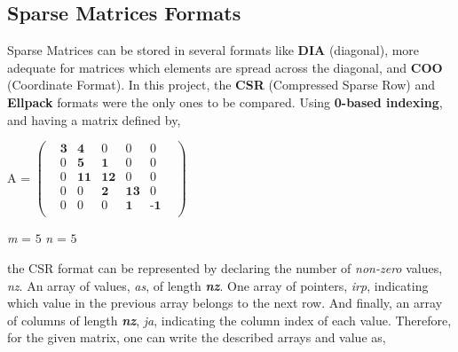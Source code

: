 \documentclass[12pt]{article}
\begin{document}
\subsection*{Sparse Matrices Formats}

\par Sparse Matrices can be stored in several formats like \textbf{DIA} (diagonal), more adequate for matrices which elements are spread across the diagonal,  and \textbf{COO} (Coordinate Format).\cite{sparse-gpu} In this project, the \textbf{CSR} (Compressed Sparse Row) and \textbf{Ellpack} formats were the only ones to be compared. Using \textbf{0-based indexing}, and having a matrix defined by,

\begin{center}
\centering
\begin{minipage}{.4\textwidth}
  \flushright
  A  =   
	$
	\begin{pmatrix}
    & \textbf{3} & \textbf{4} & 0 & 0 & 0 & \\
    & 0 & \textbf{5} & \textbf{1} & 0 & 0 & \\
    & 0 & \textbf{11} & \textbf{12} & 0 & 0 & \\
    & 0 & 0 & \textbf{2} & \textbf{13} & 0 & \\
    & 0 & 0 & 0 & \textbf{1} & \textbf{-1} & \\
	\end{pmatrix}
	$
\end{minipage}%
\begin{minipage}{.4\textwidth}
 \center
  \textit{m} = $5$
  \linebreak
  \textit{n} = $5$
\end{minipage}
\linebreak
\end{center}

\par the CSR format can be represented by declaring the number of \textit{non-zero} values, \textit{nz}. An array of values, \textit{as}, of length \textbf{\textit{nz}}. One array of pointers, \textit{irp}, indicating which value in the previous array belongs to the next row. And finally, an array of columns of length \textbf{\textit{nz}}, \textit{ja}, indicating the column index of each value. Therefore, for the given matrix, one can write the described arrays and value as,
\end{document}
